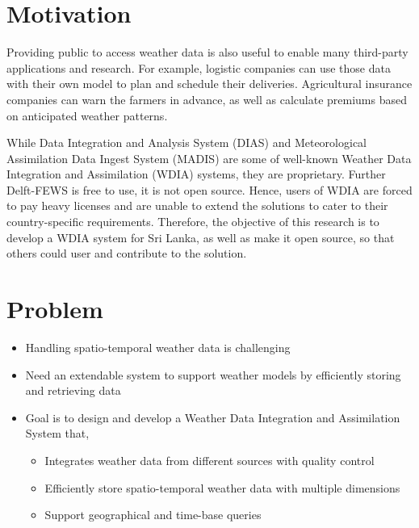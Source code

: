 \documentclass[a4paper,oneside,12pt]{report}
\begin{document}
\section{Motivation}
Providing public to access weather data is also useful to enable many third-party applications and research. For example, logistic companies can use those data with their own model to plan and schedule their deliveries. Agricultural insurance companies can warn the farmers in advance, as well as calculate premiums based on anticipated weather patterns.

While Data Integration and Analysis System (DIAS) and Meteorological Assimilation Data Ingest System (MADIS) are some of well-known Weather Data Integration and Assimilation (WDIA) systems, they are proprietary. Further Delft-FEWS is free to use, it is not open source. Hence, users of WDIA are forced to pay heavy licenses and are unable to extend the solutions to cater to their country-specific requirements. Therefore, the objective of this research is to develop a WDIA system for Sri Lanka, as well as make it open source, so that others could user and contribute to the solution.


\section{Problem}
\begin{itemize}
    \item Handling spatio-temporal weather data is challenging
    \item Need an extendable system to support weather models by efficiently storing and retrieving data
    \item Goal is to design and develop a Weather Data Integration and Assimilation System that,
    \begin{itemize}
        \item Integrates weather data from different sources with quality control
        \item Efficiently store spatio-temporal weather data with multiple dimensions
        \item Support geographical and time-base queries
    \end{itemize}
\end{itemize}
\end{document}
